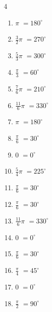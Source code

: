 \begin{multicols}{4}
\begin{enumerate}
  \item $\displaystyle \pi$
        $\displaystyle =180^{\circ}$

  \item $\displaystyle \frac{3}{2}\pi$
        $\displaystyle =270^{\circ}$

  \item $\displaystyle \frac{5}{3}\pi$
        $\displaystyle =300^{\circ}$

  \item $\displaystyle \frac{\pi}{3}$
        $\displaystyle =60^{\circ}$

  \item $\displaystyle \frac{7}{6}\pi$
        $\displaystyle =210^{\circ}$

  \item $\displaystyle \frac{11}{6}\pi$
        $\displaystyle =330^{\circ}$

  \item $\displaystyle \pi$
        $\displaystyle =180^{\circ}$

  \item $\displaystyle \frac{\pi}{6}$
        $\displaystyle =30^{\circ}$

  \item $\displaystyle 0$
        $\displaystyle =0^{\circ}$

  \item $\displaystyle \frac{5}{4}\pi$
        $\displaystyle =225^{\circ}$

  \item $\displaystyle \frac{\pi}{6}$
        $\displaystyle =30^{\circ}$

  \item $\displaystyle \frac{\pi}{6}$
        $\displaystyle =30^{\circ}$

  \item $\displaystyle \frac{11}{6}\pi$
        $\displaystyle =330^{\circ}$

  \item $\displaystyle 0$
        $\displaystyle =0^{\circ}$

  \item $\displaystyle \frac{\pi}{6}$
        $\displaystyle =30^{\circ}$

  \item $\displaystyle \frac{\pi}{4}$
        $\displaystyle =45^{\circ}$

  \item $\displaystyle 0$
        $\displaystyle =0^{\circ}$

  \item $\displaystyle \frac{\pi}{2}$
        $\displaystyle =90^{\circ}$


\end{enumerate}
\end{multicols}
